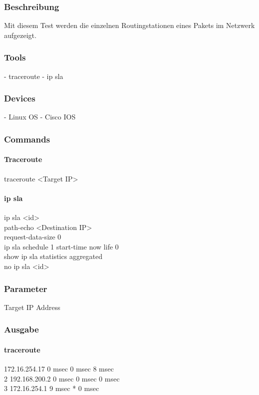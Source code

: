 \documentclass[a4,12pt]{scrartcl}
\begin{document}
\subsubsection{Beschreibung}
Mit diesem Test werden die einzelnen Routingstationen eines Pakets im Netzwerk aufgezeigt. 
\subsubsection{Tools}
- traceroute
- ip sla
\subsubsection{Devices}
- Linux OS
- Cisco IOS
\subsubsection{Commands}
\paragraph{Traceroute}\hfill

\noindent traceroute <Target IP>
\paragraph{ip sla}\hfill

\noindent ip sla <id>\\
path-echo <Destination IP>\\
request-data-size 0\\
ip sla schedule 1 start-time now life 0\\
show ip sla statistics aggregated\\
no ip sla <id>
\subsubsection{Parameter}
Target IP Address
\subsubsection{Ausgabe}
\newline
\paragraph{traceroute}\hfill

   172.16.254.17 0 msec 0 msec 8 msec\\
  2 192.168.200.2 0 msec 0 msec 0 msec\\
  3 172.16.254.1 9 msec *  0 msec
\end{document}
